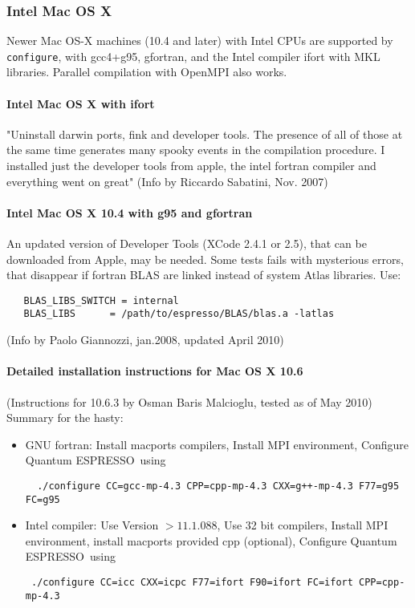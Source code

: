 \documentclass[12pt,a4paper]{article}
\def\qe{{\sc Quantum ESPRESSO}}
\def\configure{\texttt{configure}}
\begin{document}
\subsubsection{Intel Mac OS X}

Newer Mac OS-X machines (10.4 and later) with Intel CPUs are supported 
by \configure,
with gcc4+g95, gfortran, and the Intel compiler ifort with MKL libraries.
Parallel compilation with OpenMPI also works.

\paragraph{Intel Mac OS X with ifort}

"Uninstall darwin ports, fink and developer tools. The presence of all of
those at the same time generates many spooky events in the compilation
procedure.  I installed just the developer tools from apple, the intel
fortran compiler and everything went on great" (Info by Riccardo Sabatini, 
Nov. 2007)

\paragraph{Intel Mac OS X 10.4 with g95 and gfortran}

An updated version of Developer Tools (XCode 2.4.1 or 2.5), that can be 
downloaded from Apple, may be needed. Some tests fails with mysterious 
errors, that disappear if
fortran BLAS are linked instead of system Atlas libraries. Use: 
\begin{verbatim}
   BLAS_LIBS_SWITCH = internal
   BLAS_LIBS      = /path/to/espresso/BLAS/blas.a -latlas
\end{verbatim}
(Info by Paolo Giannozzi, jan.2008, updated April 2010)

\paragraph{Detailed installation instructions for Mac OS X 10.6}

(Instructions for 10.6.3 by Osman Baris Malcioglu, tested as of May 2010)
Summary for the hasty: 
\begin{itemize}
\item GNU fortran:
Install macports compilers, 
Install MPI environment,
Configure \qe\  using
\begin{verbatim}
  ./configure CC=gcc-mp-4.3 CPP=cpp-mp-4.3 CXX=g++-mp-4.3 F77=g95 FC=g95
\end{verbatim}
\item Intel compiler:
Use Version $>11.1.088$,
Use 32 bit compilers,
Install MPI environment,
install macports provided cpp (optional),
Configure \qe\ using
\begin{verbatim}
 ./configure CC=icc CXX=icpc F77=ifort F90=ifort FC=ifort CPP=cpp-mp-4.3
\end{verbatim}
\end{itemize}
\end{document}
